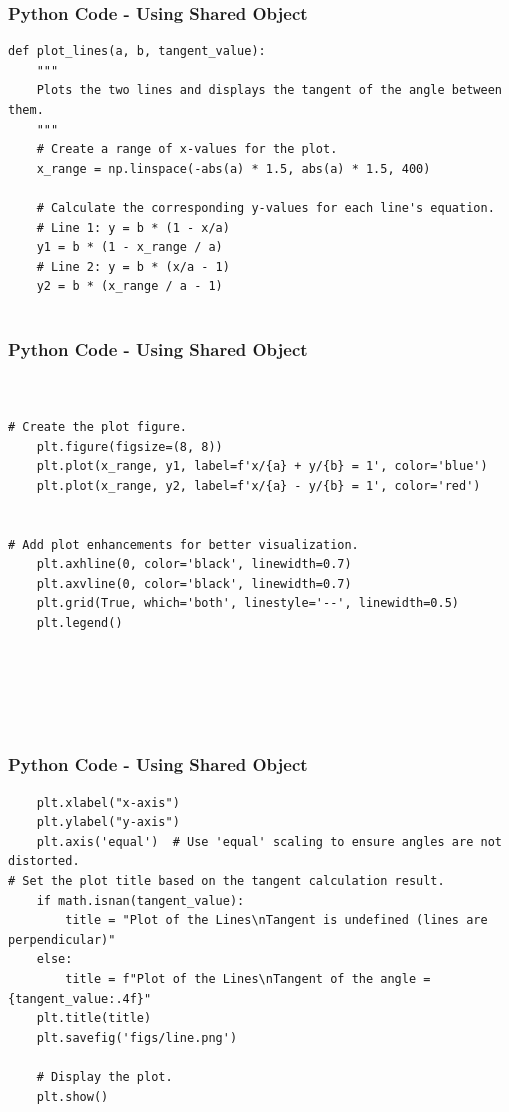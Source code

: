 \documentclass{beamer}
\begin{document}
\begin{frame}[fragile]
    \frametitle{Python Code - Using Shared Object}
    \begin{lstlisting}
def plot_lines(a, b, tangent_value):
    """
    Plots the two lines and displays the tangent of the angle between them.
    """
    # Create a range of x-values for the plot.
    x_range = np.linspace(-abs(a) * 1.5, abs(a) * 1.5, 400)

    # Calculate the corresponding y-values for each line's equation.
    # Line 1: y = b * (1 - x/a)
    y1 = b * (1 - x_range / a)
    # Line 2: y = b * (x/a - 1)
    y2 = b * (x_range / a - 1)


\end{lstlisting}
\end{frame}
\begin{frame}[fragile]
    \frametitle{Python Code - Using Shared Object}
    \begin{lstlisting}


# Create the plot figure.
    plt.figure(figsize=(8, 8))
    plt.plot(x_range, y1, label=f'x/{a} + y/{b} = 1', color='blue')
    plt.plot(x_range, y2, label=f'x/{a} - y/{b} = 1', color='red')

    
# Add plot enhancements for better visualization.
    plt.axhline(0, color='black', linewidth=0.7)
    plt.axvline(0, color='black', linewidth=0.7)
    plt.grid(True, which='both', linestyle='--', linewidth=0.5)
    plt.legend()






\end{lstlisting}
\end{frame}

\begin{frame}[fragile]
     \frametitle{Python Code - Using Shared Object}
     \begin{lstlisting}
    plt.xlabel("x-axis")
    plt.ylabel("y-axis")
    plt.axis('equal')  # Use 'equal' scaling to ensure angles are not distorted.
# Set the plot title based on the tangent calculation result.
    if math.isnan(tangent_value):
        title = "Plot of the Lines\nTangent is undefined (lines are perpendicular)"
    else:
        title = f"Plot of the Lines\nTangent of the angle = {tangent_value:.4f}"
    plt.title(title)
    plt.savefig('figs/line.png')

    # Display the plot.
    plt.show()

     \end{lstlisting}
     \end{frame}
\end{document}
